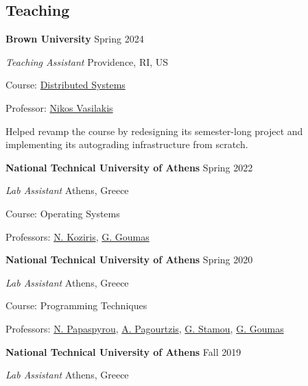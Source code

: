 \documentclass[margin,12pt]{resume}
\newcommand{\descriptionVSpace}{\vspace{0.5ex}\xspace}
\newcommand{\subsectionVSpace}{\vspace{3.5ex}\xspace}
\newcommand{\sectionVSpace}{\vspace{1ex}\xspace} %
\newcommand{\sectionVSpaceCorrection}{\vspace{-3.5ex}} %
\newcommand{\header}[1]{\textbf{#1}\xspace}
\newcommand{\institution}[1]{\header{#1}\xspace}
\newcommand{\place}[1]{#1\xspace}
\newcommand{\role}[1]{\textit{#1}\xspace}
\newcommand{\singleDate}[1]{#1\xspace}
\newcommand{\stitle}[1]{#1:\xspace}
\newenvironment{rSubsection}{}{\par\subsectionVSpace}
\newenvironment{rSection}[1]{\sectionVSpaceCorrection\section{#1}\xspace}{\sectionVSpace\par}
\newenvironment{jobDuties}{\descriptionVSpace}{\par}
\begin{document}
\begin{resume}
\begin{rSection}{Teaching}
        \begin{rSubsection}
            \institution{Brown University} \hfill \singleDate{Spring 2024}

            \role{Teaching Assistant} \hfill \place{Providence, RI, US}

            \stitle{Course} \href{https://cs.brown.edu/courses/csci1380/s24/}{Distributed Systems}

            \stitle{Professor} \href{https://nikos.vasilak.is}{Nikos Vasilakis}

            \begin{jobDuties}
                Helped revamp the course by redesigning its semester-long project and implementing its autograding infrastructure from scratch.
            \end{jobDuties}
        \end{rSubsection}

        \begin{rSubsection}
            \institution{National Technical University of Athens} \hfill \singleDate{Spring 2022}

            \role{Lab Assistant} \hfill \place{Athens, Greece}

            \stitle{Course} Operating Systems

            \stitle{Professors} \href{http://www.cslab.ntua.gr/~nkoziris/}{N. Koziris}, \href{http://www.cslab.ntua.gr/~goumas/}{G. Goumas}
        \end{rSubsection}

        \begin{rSubsection}
            \institution{National Technical University of Athens} \hfill \singleDate{Spring 2020}

            \role{Lab Assistant} \hfill \place{Athens, Greece}

            \stitle{Course} Programming Techniques

            \stitle{Professors} \href{http://www.softlab.ntua.gr/~nickie/}{N. Papaspyrou}, \href{http://users.softlab.ntua.gr/~pagour/}{A. Pagourtzis}, \href{http://www.image.ntua.gr/~gstam/}{G. Stamou}, \href{http://www.cslab.ntua.gr/~goumas/}{G. Goumas}
        \end{rSubsection}

        \begin{rSubsection}
            \institution{National Technical University of Athens} \hfill \singleDate{Fall 2019}

            \role{Lab Assistant} \hfill \place{Athens, Greece}


\end{rSubsection}
\end{rSection}
\end{resume}
\end{document}
